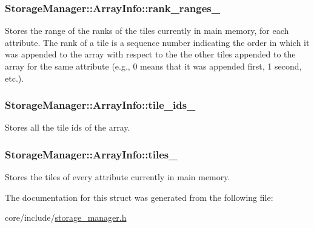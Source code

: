 \subsubsection[{rank\+\_\+ranges\+\_\+}]{ Storage\+Manager\+::\+Array\+Info\+::rank\+\_\+ranges\+\_\+}\label{structStorageManager_1_1ArrayInfo_af758a081c7584aed42a93693f92f3115}
Stores the range of the ranks of the tiles currently in main memory, for each attribute. The rank of a tile is a sequence number indicating the order in which it was appended to the array with respect to the the other tiles appended to the array for the same attribute (e.\+g., 0 means that it was appended first, 1 second, etc.). \hypertarget{structStorageManager_1_1ArrayInfo_ae3b3ba9aaa9866f00897ec68ead6027d}{}
\subsubsection[{tile\+\_\+ids\+\_\+}]{ Storage\+Manager\+::\+Array\+Info\+::tile\+\_\+ids\+\_\+}\label{structStorageManager_1_1ArrayInfo_ae3b3ba9aaa9866f00897ec68ead6027d}
Stores all the tile ids of the array. \hypertarget{structStorageManager_1_1ArrayInfo_afa92dcd8efd689d609d19ee65d5b1699}{}
\subsubsection[{tiles\+\_\+}]{ Storage\+Manager\+::\+Array\+Info\+::tiles\+\_\+}\label{structStorageManager_1_1ArrayInfo_afa92dcd8efd689d609d19ee65d5b1699}
Stores the tiles of every attribute currently in main memory. 

The documentation for this struct was generated from the following file\+:\begin{DoxyCompactItemize}
\item 
core/include/\hyperlink{storage__manager_8h}{storage\+\_\+manager.\+h}\end{DoxyCompactItemize}
